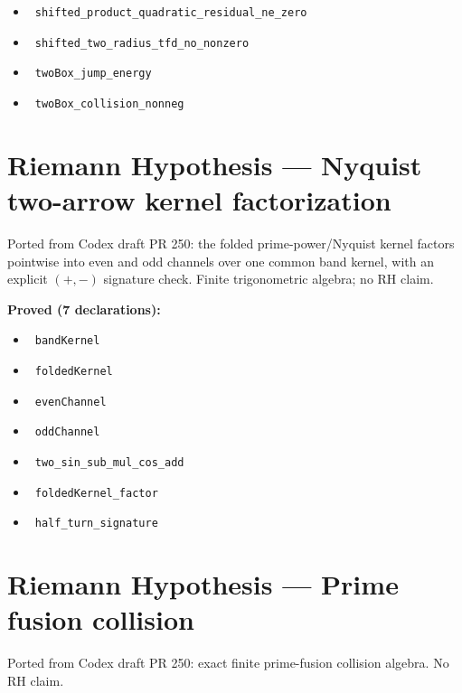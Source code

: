 \documentclass{report}
\theoremstyle{definition}
\begin{document}
\begin{itemize}
  \item {}\leanok\ \texttt{shifted\_product\_quadratic\_residual\_ne\_zero}
  \item {}\leanok\ \texttt{shifted\_two\_radius\_tfd\_no\_nonzero}
  \item {}\leanok\ \texttt{twoBox\_jump\_energy}
  \item {}\leanok\ \texttt{twoBox\_collision\_nonneg}
\end{itemize}

\section{Riemann Hypothesis --- Nyquist two-arrow kernel factorization}
Ported from Codex draft PR 250: the folded prime-power/Nyquist kernel factors pointwise into even and odd channels over one common band kernel, with an explicit $(+,-)$ signature check. Finite trigonometric algebra; no RH claim.

\noindent\textbf{Proved (7 declarations):}
\begin{itemize}
  \item {}\leanok\ \texttt{bandKernel}
  \item {}\leanok\ \texttt{foldedKernel}
  \item {}\leanok\ \texttt{evenChannel}
  \item {}\leanok\ \texttt{oddChannel}
  \item {}\leanok\ \texttt{two\_sin\_sub\_mul\_cos\_add}
  \item {}\leanok\ \texttt{foldedKernel\_factor}
  \item {}\leanok\ \texttt{half\_turn\_signature}
\end{itemize}

\section{Riemann Hypothesis --- Prime fusion collision}
Ported from Codex draft PR 250: exact finite prime-fusion collision algebra. No RH claim.
\end{document}
